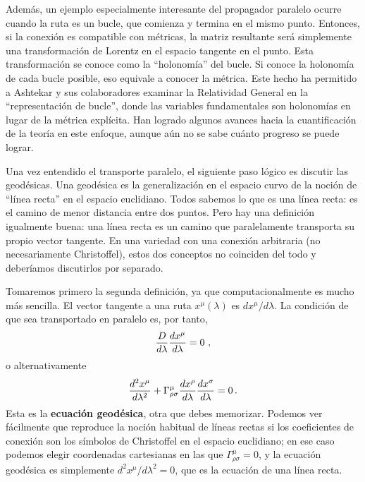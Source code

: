 \documentclass[11pt,b5paper,openany,twoside]{book}
\begin{document}
Además, un ejemplo especialmente interesante del propagador paralelo ocurre cuando la ruta es un bucle, que comienza y termina en el mismo punto.
Entonces, si la conexión es compatible con métricas, la matriz resultante será simplemente una transformación de Lorentz en el espacio tangente en el punto.
Esta transformación se conoce como la ``holonomía'' del bucle.
Si conoce la holonomía de cada bucle posible, eso equivale a conocer la métrica.
Este hecho ha permitido a Ashtekar y sus colaboradores examinar la Relatividad General en la ``representación de bucle'', donde las variables fundamentales son holonomías en lugar de la métrica explícita.
Han logrado algunos avances hacia la cuantificación de la teoría en este enfoque, aunque aún no se sabe cuánto progreso se puede lograr.

Una vez entendido el transporte paralelo, el siguiente paso lógico es discutir las geodésicas.
Una geodésica es la generalización en el espacio curvo de la noción de ``línea recta'' en el espacio euclidiano.
Todos sabemos lo que es una línea recta: es el camino de menor distancia entre dos puntos.
Pero hay una definición igualmente buena: una línea recta es un camino que paralelamente transporta su propio vector tangente.
En una variedad con una conexión arbitraria (no necesariamente Christoffel), estos dos conceptos no coinciden del todo y deberíamos discutirlos por separado.

Tomaremos primero la segunda definición, ya que computacionalmente es mucho más sencilla.
El vector tangente a una ruta $x^\mu(\lambda)$ es $dx^\mu/d\lambda$.
La condición de que sea transportado en paralelo es, por tanto,
\begin{equation}
{{D}\over{d\lambda}}{{dx^\mu}\over{d\lambda}}=0\ ,\label{3.46}
\end{equation}
o alternativamente
\begin{equation}
{{d^2x^\mu}\over{d\lambda^2}}+\Gamma^\mu_{\rho\sigma}
{{dx^\rho}\over{d\lambda}}{{dx^\sigma}\over{d\lambda}}=0\,.
\label{3.47}
\end{equation}
Esta es la {\bf ecuación geodésica}, otra que debes memorizar.
Podemos ver fácilmente que reproduce la noción habitual de líneas rectas si los coeficientes de conexión son los símbolos de Christoffel en el espacio euclidiano; en ese caso podemos elegir coordenadas cartesianas en las que $\Gamma^\mu_{\rho\sigma}=0$, y la ecuación geodésica es simplemente $d^2x^\mu/d\lambda^2=0$, que es la ecuación de una línea recta.
\end{document}
